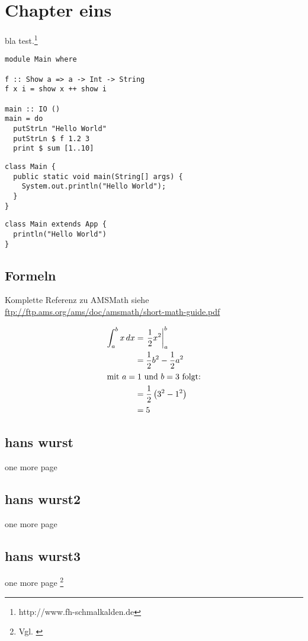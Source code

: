 \chapter{Chapter eins}
bla test.\footnote{http://www.fh-schmalkalden.de}

\begin{lstlisting}[label=listinghaskell,caption=This is Haskell]
module Main where

f :: Show a => a -> Int -> String
f x i = show x ++ show i

main :: IO ()
main = do
  putStrLn "Hello World"
  putStrLn $ f 1.2 3
  print $ sum [1..10]
\end{lstlisting}

\begin{lstlisting}[label=listingjava,caption=This is Java]
class Main {
  public static void main(String[] args) {
    System.out.println("Hello World");
  }
}
\end{lstlisting}

\begin{lstlisting}[label=listingscala,caption=This is Scala]
class Main extends App {
  println("Hello World")
}
\end{lstlisting}

\newpage
\section{Formeln}

Komplette Referenz zu AMSMath siehe \\
\url{ftp://ftp.ams.org/ams/doc/amsmath/short-math-guide.pdf}

\begin{align}
 \int_{a}^{b} x\,dx
 & = \left.\frac{1}{2} x^2\right\vert_{a}^{b}\\
 & = \frac{1}{2} b^2 - \frac{1}{2} a^2 \\
 \intertext{mit $a=1$ und $b=3$ folgt:}
 \notag
 & = \frac{1}{2} \left(3^2 - 1^2\right)\\
 & = 5
\end{align}

\section{hans wurst}
one more page

\newpage
\section{hans wurst2}
one more page

\newpage
\section{hans wurst3}
one more page \footnote{Vgl. \cite{braun:scala}}

